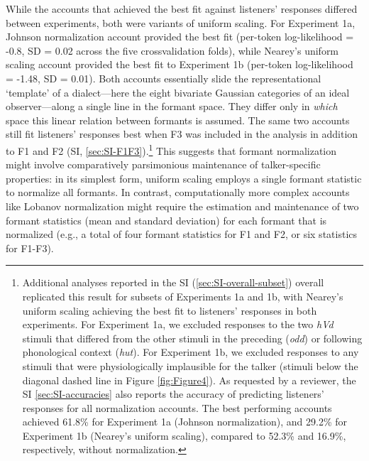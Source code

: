 \documentclass[preprint]{JASA}
\begin{document}
While the accounts that achieved the best fit against listeners' responses differed between experiments, both were variants of uniform scaling. For Experiment 1a, Johnson normalization account provided the best fit (per-token log-likelihood = -0.8, SD = 0.02 across the five crossvalidation folds), while Nearey's uniform scaling account provided the best fit to Experiment 1b (per-token log-likelihood = -1.48, SD = 0.01). Both accounts essentially slide the representational `template' of a dialect---here the eight bivariate Gaussian categories of an ideal observer---along a single line in the formant space. They differ only in \emph{which} space this linear relation between formants is assumed. The same two accounts still fit listeners' responses best when F3 was included in the analysis in addition to F1 and F2 (SI, \ref{sec:SI-F1F3}).\footnote{Additional analyses reported in the SI (\ref{sec:SI-overall-subset}) overall replicated this result for subsets of Experiments 1a and 1b, with Nearey's uniform scaling achieving the best fit to listeners' responses in both experiments. For Experiment 1a, we excluded responses to the two \emph{hVd} stimuli that differed from the other stimuli in the preceding (\emph{odd}) or following phonological context (\emph{hut}). For Experiment 1b, we excluded responses to any stimuli that were physiologically implausible for the talker (stimuli below the diagonal dashed line in Figure \ref{fig:Figure4}). As requested by a reviewer, the SI \ref{sec:SI-accuracies} also reports the accuracy of predicting listeners' responses for all normalization accounts. The best performing accounts achieved 61.8\% for Experiment 1a (Johnson normalization), and 29.2\% for Experiment 1b (Nearey's uniform scaling), compared to 52.3\% and 16.9\%, respectively, without normalization.} This suggests that formant normalization might involve comparatively parsimonious maintenance of talker-specific properties: in its simplest form, uniform scaling employs a single formant statistic to normalize all formants. In contrast, computationally more complex accounts like Lobanov normalization might require the estimation and maintenance of two formant statistics (mean and standard deviation) for each formant that is normalized (e.g., a total of four formant statistics for F1 and F2, or six statistics for F1-F3).
\end{document}
